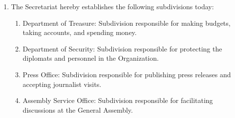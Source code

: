 



\begin{enumerate}
	\item The Secretariat hereby establishes the following subdivisions today:
    \begin{enumerate}
        \item Department of Treasure: Subdivision responsible for making budgets, taking accounts, and spending money.
        \item Department of Security: Subdivision responsible for protecting the diplomats and personnel in the Organization.
        \item Press Office: Subdivision responsible for publishing press releases and accepting journalist visits.
        \item Assembly Service Office: Subdivision responsible for facilitating discussions at the General Assembly.
    \end{enumerate}
\end{enumerate}



